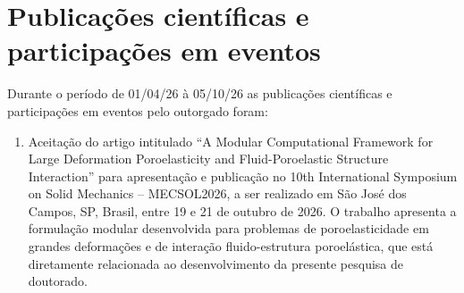 \chapter{Publicações científicas e participações em eventos}

Durante o período de 01/04/26 à 05/10/26 as publicações científicas e participações em eventos pelo outorgado foram:

\begin{enumerate}
    \item Aceitação do artigo intitulado ``A Modular Computational Framework for Large Deformation Poroelasticity and Fluid-Poroelastic Structure Interaction'' para apresentação e publicação no 10th International Symposium on Solid Mechanics -- MECSOL2026, a ser realizado em São José dos Campos, SP, Brasil, entre 19 e 21 de outubro de 2026. O trabalho apresenta a formulação modular desenvolvida para problemas de poroelasticidade em grandes deformações e de interação fluido-estrutura poroelástica, que está diretamente relacionada ao desenvolvimento da presente pesquisa de doutorado.
\end{enumerate}